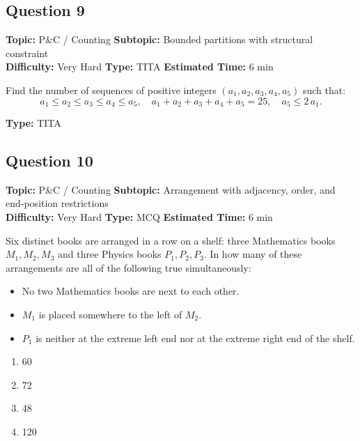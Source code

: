 \documentclass[11pt,a4paper]{article}
\begin{document}
\subsection*{Question 9}
\textbf{Topic:} P\&C / Counting \quad
\textbf{Subtopic:} Bounded partitions with structural constraint \\
\textbf{Difficulty:} Very Hard \quad
\textbf{Type:} TITA \quad
\textbf{Estimated Time:} 6 min
\begin{tcolorbox}[qbox]
Find the number of sequences of positive integers \((a_1, a_2, a_3, a_4, a_5)\) such that:
\[
a_1 \leq a_2 \leq a_3 \leq a_4 \leq a_5, \quad a_1 + a_2 + a_3 + a_4 + a_5 = 25, \quad a_5 \leq 2\, a_1.
\]
\end{tcolorbox}
\textbf{Type:} TITA

\subsection*{Question 10}
\textbf{Topic:} P\&C / Counting \quad
\textbf{Subtopic:} Arrangement with adjacency, order, and end-position restrictions \\
\textbf{Difficulty:} Very Hard \quad
\textbf{Type:} MCQ \quad
\textbf{Estimated Time:} 6 min
\begin{tcolorbox}[qbox]
Six distinct books are arranged in a row on a shelf: three Mathematics books \(M_1, M_2, M_3\) and three Physics books \(P_1, P_2, P_3\). In how many of these arrangements are all of the following true simultaneously:
\begin{itemize}[leftmargin=*,topsep=0pt,itemsep=0pt]
    \item No two Mathematics books are next to each other.
    \item \(M_1\) is placed somewhere to the left of \(M_2\).
    \item \(P_1\) is neither at the extreme left end nor at the extreme right end of the shelf.
\end{itemize}
\end{tcolorbox}
\begin{enumerate}[label=(\Alph*)]
\item 60
\item 72
\item 48
\item 120
\end{enumerate}

\end{document}
